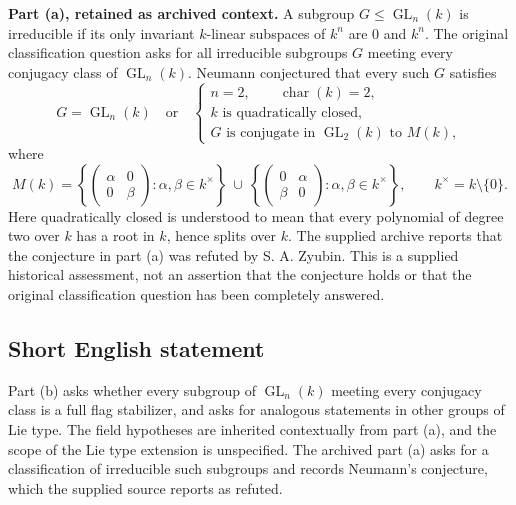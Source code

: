 \documentclass[11pt]{article}
\begin{document}
\textbf{Part (a), retained as archived context.} A subgroup \(G\leq\operatorname{GL}_n(k)\) is irreducible if its only invariant \(k\)-linear subspaces of \(k^n\) are \(0\) and \(k^n\). The original classification question asks for all irreducible subgroups \(G\) meeting every conjugacy class of \(\operatorname{GL}_n(k)\). Neumann conjectured that every such \(G\) satisfies
\[
G=\operatorname{GL}_n(k)
\quad\text{or}\quad
\left\{
\begin{gathered}
n=2,\qquad \operatorname{char}(k)=2,\\
k\text{ is quadratically closed},\\
G\text{ is conjugate in }\operatorname{GL}_2(k)\text{ to }M(k),
\end{gathered}
\right.
\]
where
\[
M(k)=
\left\{\begin{pmatrix}\alpha&0\\0&\beta\end{pmatrix}:\alpha,\beta\in k^\times\right\}
\ \cup\ 
\left\{\begin{pmatrix}0&\alpha\\\beta&0\end{pmatrix}:\alpha,\beta\in k^\times\right\},
\qquad k^\times=k\setminus\{0\}.
\]
Here quadratically closed is understood to mean that every polynomial of degree two over \(k\) has a root in \(k\), hence splits over \(k\). The supplied archive reports that the conjecture in part (a) was refuted by S. A. Zyubin. This is a supplied historical assessment, not an assertion that the conjecture holds or that the original classification question has been completely answered.
\subsection{Short English statement}
Part (b) asks whether every subgroup of \(\operatorname{GL}_n(k)\) meeting every conjugacy class is a full flag stabilizer, and asks for analogous statements in other groups of Lie type. The field hypotheses are inherited contextually from part (a), and the scope of the Lie type extension is unspecified. The archived part (a) asks for a classification of irreducible such subgroups and records Neumann's conjecture, which the supplied source reports as refuted.
\end{document}
